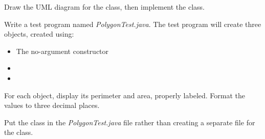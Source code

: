 \begin{exercise}
Draw the UML diagram for the class, then implement the class.

Write a test program named {\em PolygonTest.java}. The test program will create three  objects, created using:
\begin{itemize}
    \item The no-argument constructor
    \item {}
    \item {}
\end{itemize}

For each object, display its perimeter and area, properly labeled. Format the values to three decimal places.

Put the  class in the {\em PolygonTest.java} file rather than creating a separate file for the class. 
\end{exercise}

